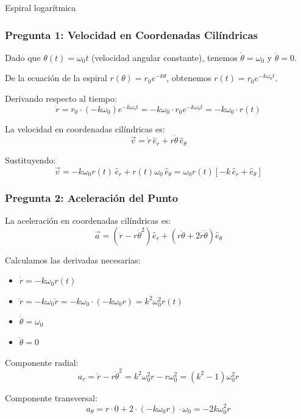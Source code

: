 \begin{solucion}{Espiral logarítmica}
\subsubsection*{Pregunta 1: Velocidad en Coordenadas Cilíndricas}

Dado que $\theta(t) = \omega_0 t$ (velocidad angular constante), tenemos $\dot{\theta} = \omega_0$ y $\ddot{\theta} = 0$.

De la ecuación de la espiral $r(\theta) = r_0 e^{-k\theta}$, obtenemos $r(t) = r_0 e^{-k\omega_0 t}$.

Derivando respecto al tiempo:
$$\dot{r} = r_0 \cdot (-k\omega_0) e^{-k\omega_0 t} = -k\omega_0 \cdot r_0 e^{-k\omega_0 t} = -k\omega_0 \cdot r(t)$$

La velocidad en coordenadas cilíndricas es:
$$\vec{v} = \dot{r} \, \hat{e}_r + r\dot{\theta} \, \hat{e}_\theta$$

Sustituyendo:
\begin{equation}
\boxed{\vec{v} = -k\omega_0 r(t) \, \hat{e}_r + r(t) \omega_0 \, \hat{e}_\theta = \omega_0 r(t) \left[ -k \, \hat{e}_r + \hat{e}_\theta \right]}
\end{equation}

\subsubsection*{Pregunta 2: Aceleración del Punto}

La aceleración en coordenadas cilíndricas es:
$$\vec{a} = (\ddot{r} - r\dot{\theta}^2) \hat{e}_r + (r\ddot{\theta} + 2\dot{r}\dot{\theta}) \hat{e}_\theta$$

Calculamos las derivadas necesarias:
\begin{itemize}
    \item $\dot{r} = -k\omega_0 r(t)$
    \item $\ddot{r} = -k\omega_0 \dot{r} = -k\omega_0 \cdot (-k\omega_0 r) = k^2 \omega_0^2 r(t)$
    \item $\dot{\theta} = \omega_0$
    \item $\ddot{\theta} = 0$
\end{itemize}

Componente radial:
$$a_r = \ddot{r} - r\dot{\theta}^2 = k^2 \omega_0^2 r - r \omega_0^2 = (k^2 - 1) \omega_0^2 r$$

Componente transversal:
$$a_\theta = r \cdot 0 + 2 \cdot (-k\omega_0 r) \cdot \omega_0 = -2k\omega_0^2 r$$


\end{solucion}
